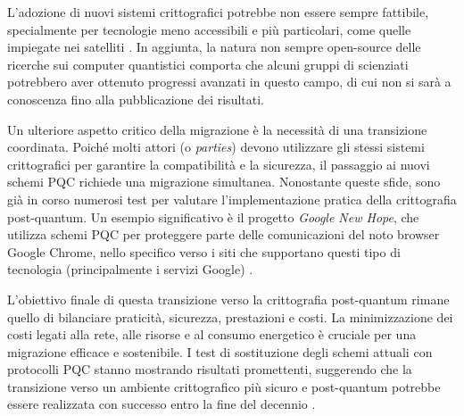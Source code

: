 L'adozione di nuovi sistemi crittografici potrebbe non essere sempre fattibile, specialmente per tecnologie meno accessibili e più particolari, come quelle impiegate nei satelliti \cite{nature-pqc}. In aggiunta, la natura non sempre open-source delle ricerche sui computer quantistici comporta che alcuni gruppi di scienziati potrebbero aver ottenuto progressi avanzati in questo campo, di cui non si sarà a conoscenza fino alla pubblicazione dei risultati.

Un ulteriore aspetto critico della migrazione è la necessità di una transizione coordinata. Poiché molti attori (o \textit{parties}) devono utilizzare gli stessi sistemi crittografici per garantire la compatibilità e la sicurezza, il passaggio ai nuovi schemi PQC richiede una migrazione simultanea. Nonostante queste sfide, sono già in corso numerosi test per valutare l'implementazione pratica della crittografia post-quantum. Un esempio significativo è il progetto \textit{Google New Hope}, che utilizza schemi PQC per proteggere parte delle comunicazioni del noto browser Google Chrome, nello specifico verso i siti che supportano questi tipo di tecnologia (principalmente i servizi Google) \cite{wikipedia_newhope}.

L'obiettivo finale di questa transizione verso la crittografia post-quantum rimane quello di bilanciare praticità, sicurezza, prestazioni e costi. La minimizzazione dei costi legati alla rete, alle risorse e al consumo energetico è cruciale per una migrazione efficace e sostenibile. I test di sostituzione degli schemi attuali con protocolli PQC stanno mostrando risultati promettenti, suggerendo che la transizione verso un ambiente crittografico più sicuro e post-quantum potrebbe essere realizzata con successo entro la fine del decennio \cite{NISTthirdReport}.